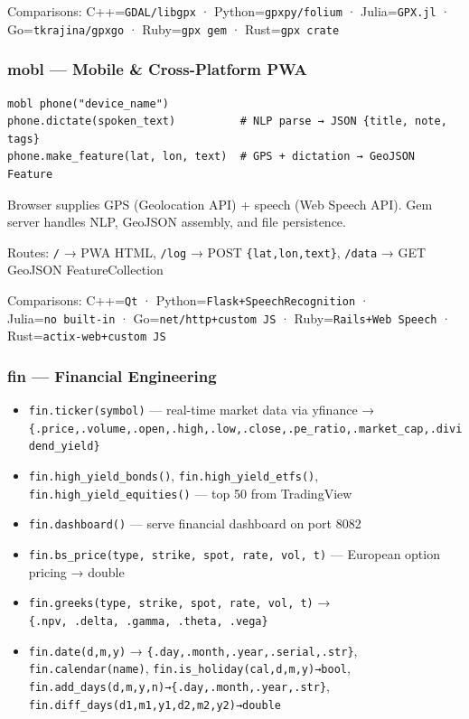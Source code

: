 \documentclass[
]{article}
\providecommand{\tightlist}{%
  \setlength{\itemsep}{0pt}\setlength{\parskip}{0pt}}
\begin{document}
Comparisons: C++=\texttt{GDAL/libgpx} · Python=\texttt{gpxpy/folium} ·
Julia=\texttt{GPX.jl} · Go=\texttt{tkrajina/gpxgo} ·
Ruby=\texttt{gpx\ gem} · Rust=\texttt{gpx\ crate}

\subsubsection{mobl --- Mobile \& Cross-Platform
PWA}\label{mobl-mobile-cross-platform-pwa}

\begin{verbatim}
mobl phone("device_name")
phone.dictate(spoken_text)          # NLP parse → JSON {title, note, tags}
phone.make_feature(lat, lon, text)  # GPS + dictation → GeoJSON Feature
\end{verbatim}

Browser supplies GPS (Geolocation API) + speech (Web Speech API). Gem
server handles NLP, GeoJSON assembly, and file persistence.

Routes: \texttt{/} → PWA HTML, \texttt{/log} → POST
\texttt{\{lat,lon,text\}}, \texttt{/data} → GET GeoJSON
FeatureCollection

Comparisons: C++=\texttt{Qt} · Python=\texttt{Flask+SpeechRecognition} ·
Julia=\texttt{no\ built-in} · Go=\texttt{net/http+custom\ JS} ·
Ruby=\texttt{Rails+Web\ Speech} · Rust=\texttt{actix-web+custom\ JS}

\subsubsection{fin --- Financial
Engineering}\label{fin-financial-engineering}

\begin{itemize}
\tightlist
\item
  \texttt{fin.ticker(symbol)} --- real-time market data via yfinance →
  \texttt{\{.price,.volume,.open,.high,.low,.close,.pe\_ratio,.market\_cap,.dividend\_yield\}}
\item
  \texttt{fin.high\_yield\_bonds()}, \texttt{fin.high\_yield\_etfs()},
  \texttt{fin.high\_yield\_equities()} --- top 50 from TradingView
\item
  \texttt{fin.dashboard()} --- serve financial dashboard on port 8082
\item
  \texttt{fin.bs\_price(type,\ strike,\ spot,\ rate,\ vol,\ t)} ---
  European option pricing → double
\item
  \texttt{fin.greeks(type,\ strike,\ spot,\ rate,\ vol,\ t)} →
  \texttt{\{.npv,\ .delta,\ .gamma,\ .theta,\ .vega\}}
\item
  \texttt{fin.date(d,m,y)} →
  \texttt{\{.day,.month,.year,.serial,.str\}},
  \texttt{fin.calendar(name)}, \texttt{fin.is\_holiday(cal,d,m,y)→bool},
  \texttt{fin.add\_days(d,m,y,n)→\{.day,.month,.year,.str\}},
  \texttt{fin.diff\_days(d1,m1,y1,d2,m2,y2)→double}
\end{itemize}
\end{document}
